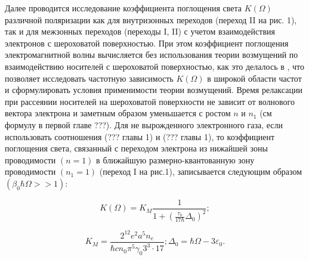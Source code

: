 {Далее проводится исследование коэффициента поглощения света $K\left(\Omega \right)$ различной поляризации как для внутризонных переходов (переход II на рис. 1), так и для межзонных переходов (переходы I, II) с учетом взаимодействия электронов с шероховатой поверхностью. При этом коэффициент поглощения электромагнитной волны вычисляется без использования теории возмущений по взаимодействию носителей с шероховатой поверхностью, как это делалось в \cite{Vurgaftman1999}, что позволяет исследовать частотную зависимость $K(\Omega)$ в широкой области частот и сформулировать условия применимости теории возмущений.
Время релаксации при рассеянии носителей на шероховатой поверхности не зависит от волнового вектора электрона и заметным образом уменьшается с ростом $n$ и $n_1$ (см формулу в первой главе ???). Для не вырожденного электронного газа, если использовать соотношения (??? главы 1) и (??? главы 1), то коэффициент поглощения света, связанный с переходом электрона из нижайшей зоны проводимости $(n=1)$ в ближайшую размерно-квантованную зону проводимости $(n_1=1)$ (переход I на рис.1), записывается следующим образом $(\beta _0\hbar \Omega >>1)$:

\begin{equation} \label{eq:21_10}
K \left(\Omega \right)=K_{M} \frac{1}{1+\left(\frac{\tau _{0} }{17\hbar } \Delta _{0} \right)^{2} } ;
\end{equation} 

\[
K_{M} =\frac{2^{12} e^{2} a^{5} n_{e} }{\hbar cn_{0} \pi ^{5} \gamma _{0} 3^{3} \cdot 17} ; \Delta _{0} =\hbar \Omega -3\varepsilon _{0}.
\]

}

